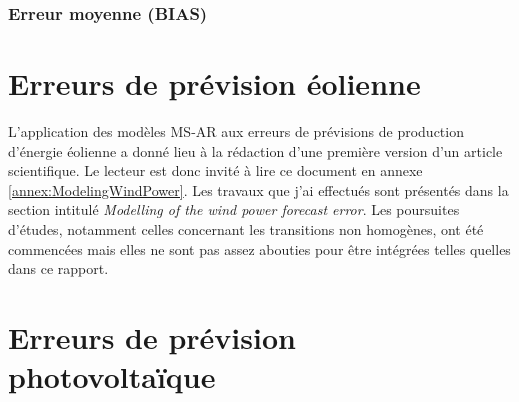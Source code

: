 \documentclass[12pt]{report}
\begin{document}
\subsection{Erreur moyenne (BIAS)}
\label{subsec:Model_Metric_BIAS}
%
%
 


\chapter{Erreurs de prévision éolienne}
\label{chap:ResultatsEolien}

L'application des modèles MS-AR aux erreurs de prévisions de production d'énergie éolienne a donné lieu à la rédaction d'une première version d'un article scientifique. Le lecteur est donc invité à lire ce document en annexe \ref{annex:ModelingWindPower}. Les travaux que j'ai effectués sont présentés dans la section intitulé \textit{Modelling of the wind power forecast error}. Les poursuites d'études, notamment celles concernant les transitions non homogènes, ont été commencées mais elles ne sont pas assez abouties pour être intégrées telles quelles dans ce rapport.

\chapter{Erreurs de prévision photovoltaïque}
\label{chap:PV}
\end{document}
